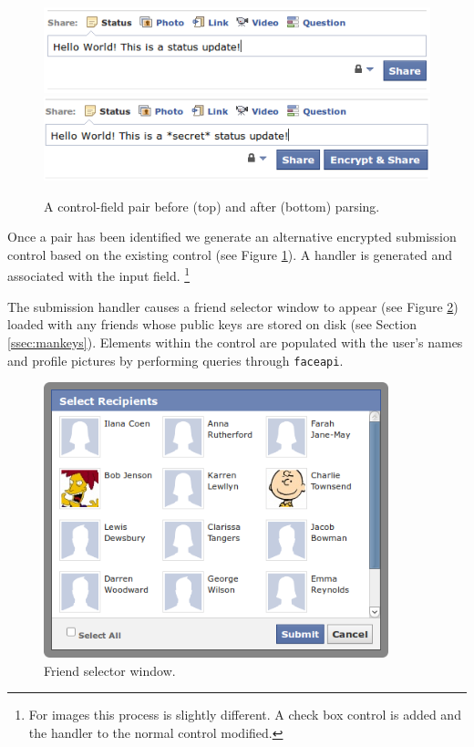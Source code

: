     \begin{figure}[tb]
        \begin{center}
                \includegraphics[width=12cm]{screens/control1.png}
                \includegraphics[width=12cm]{screens/control2.png}
            \caption{A control-field pair before (top) and after (bottom) parsing.}
            \label{scn:ctrl}
        \end{center}
    \end{figure}

Once a pair has been identified we generate an alternative encrypted submission control based on the existing control (see Figure \ref{scn:ctrl}). A handler is generated and associated with the input field. \footnote{For images this process is slightly different. A check box control is added and the handler to the normal control modified.}

The submission handler causes a friend selector window to appear (see Figure \ref{scn:fselector}) loaded with any friends whose public keys are stored on disk (see Section \ref{ssec:mankeys}). Elements within the control are populated with the user's names and profile pictures by performing queries through {\tt faceapi}.

    \begin{figure}[tb]
        \begin{center}
                \includegraphics[width=10cm]{screens/fselector.png}
            \caption{Friend selector window.}
            \label{scn:fselector}
        \end{center}
    \end{figure}

